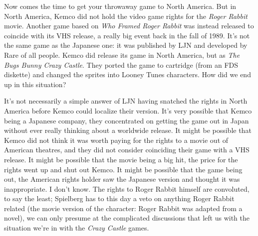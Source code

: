 \documentclass{book}
\let\oldcenter\center
\let\oldendcenter\endcenter
\renewenvironment{center}{\setlength\topsep{0pt}\oldcenter}{\oldendcenter}
\begin{document}
\begin{center}
\quad\vspace{4pt}
\quad\vspace{4pt}
\end{center}
Now comes the time to get your throwaway game to North America. But in North America, Kemco did not hold the video game rights for the \emph{Roger Rabbit} movie. Another game based on \emph{Who Framed Roger Rabbit} was instead released to coincide with its VHS release, a really big event back in the fall of 1989. It’s not the same game as the Japanese one: it was published by LJN and developed by Rare of all people. Kemco did release its game in North America, but as \emph{The Bugs Bunny Crazy Castle}. They ported the game to cartridge (from an FDS diskette) and changed the sprites into Looney Tunes characters. How did we end up in this situation?

It’s not necessarily a simple answer of LJN having snatched the rights in North America before Kemco could localize their version. It’s very possible that Kemco being a Japanese company, they concentrated on getting the game out in Japan without ever really thinking about a worldwide release. It might be possible that Kemco did not think it was worth paying for the rights to a movie out of American theatres, and they did not consider coinciding their game with a VHS release. It might be possible that the movie being a big hit, the price for the rights went up and shut out Kemco. It might be possible that the game being out, the American rights holder saw the Japanese version and thought it was inappropriate. I don’t know. The rights to Roger Rabbit himself are convoluted, to say the least; Spielberg has to this day a veto on anything Roger Rabbit related (the movie version of the character: Roger Rabbit was adapted from a novel), we can only presume at the complicated discussions that left us with the situation we’re in with the \emph{Crazy Castle} games.
\end{document}
